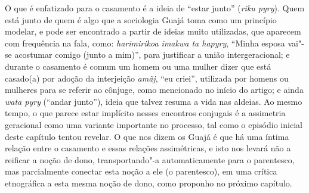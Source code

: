 O que é enfatizado para o casamento é a ideia de ``estar junto''
(\emph{riku pyry}). Quem está junto de quem é algo que a sociologia
Guajá toma como um princípio modelar, e pode ser encontrado a partir de
ideias muito utilizadas, que aparecem com frequência na fala, como:
\emph{harimirikoa imakwa ta hapyry}, ``Minha esposa vai"-se acostumar
comigo (junto a mim)'', para justificar a união intergeracional; e
durante o casamento é comum um homem ou uma mulher dizer que está
casado(a) por adoção da interjeição \emph{amãj}, ``eu criei'', utilizada
por homens ou mulheres para se referir ao cônjuge, como mencionado no
início do artigo; e ainda \emph{wata pyry} (``andar junto''), ideia que
talvez resuma a vida nas aldeias. Ao mesmo tempo, o que parece estar
implícito nesses encontros conjugais é a assimetria geracional como uma
variante importante no processo, tal como o episódio inicial deste
capítulo tentou revelar. O que nos dizem os Guajá é que há uma íntima
relação entre o casamento e essas relações assimétricas, e isto nos
levará não a reificar a noção de dono, transportando"-a automaticamente
para o parentesco, mas parcialmente conectar esta noção a ele (o
parentesco), em uma crítica etnográfica a esta mesma noção de dono, como
proponho no próximo capítulo.
